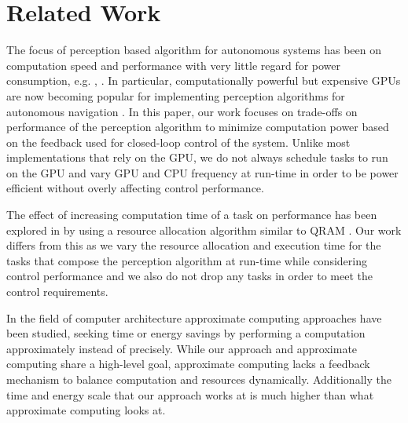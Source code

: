 \section{Related Work}

The focus of perception based algorithm for autonomous systems has been on computation speed and performance with very little regard for power consumption, e.g. \cite{forster2014svo}, \cite{CUDASLAM}. In particular, computationally powerful but expensive GPUs are now becoming popular for implementing perception algorithms for autonomous navigation \cite{CUDASLAM}. In this paper, our work focuses on trade-offs on performance of the perception algorithm to minimize computation power based on the feedback used for closed-loop control of the system. Unlike most implementations that rely on the GPU, we do not always schedule tasks to run on the GPU and vary GPU and CPU frequency at run-time in order to be power efficient without overly affecting control performance.

The effect of increasing computation time of a task on performance has been explored in \cite{overbook} by using a resource allocation algorithm similar to QRAM \cite{qram}. Our work differs from this as we vary the resource allocation and execution time for the tasks that compose the perception algorithm at run-time while considering control performance and we also do not drop any tasks in order to meet the control requirements.

In the field of computer architecture approximate computing approaches \cite{loop-perf,rely,npu} have been studied, seeking time or energy
savings by performing a computation approximately instead of precisely. While
our approach and approximate computing share a high-level goal,
approximate computing lacks a feedback mechanism to balance computation and resources dynamically. Additionally the time and energy scale that our approach works at is much higher than what approximate computing looks at.